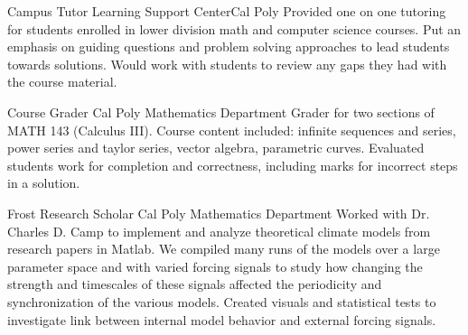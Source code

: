 \documentclass[letterpaper, 11pt, sans]{moderncv}
\begin{document}
        {Campus Tutor}
        {Learning Support Center}{Cal Poly}{}
        {
            Provided one on one tutoring for students enrolled in lower division math and computer science courses.
            Put an emphasis on guiding questions and problem solving approaches to lead students towards solutions.
            Would work with students to review any gaps they had with the course material.
        }

        {Course Grader}
        {Cal Poly Mathematics Department}{}{}
        {
            Grader for two sections of MATH 143 (Calculus III).
            Course content included: infinite sequences and series, power series and taylor series, vector algebra, parametric curves.
            Evaluated students work for completion and correctness, including marks for incorrect steps in a solution.
        }

        {Frost Research Scholar}
        {Cal Poly Mathematics Department}{}{}
        {
            Worked with Dr. Charles D. Camp to implement and analyze theoretical climate models from research papers in Matlab.
            We compiled many runs of the models over a large parameter space and with varied forcing signals to study how changing the strength and timescales of these signals affected the periodicity and synchronization of the various models.
            Created visuals and statistical tests to investigate link between internal model behavior and external forcing signals.
        }


% 
\end{document}
